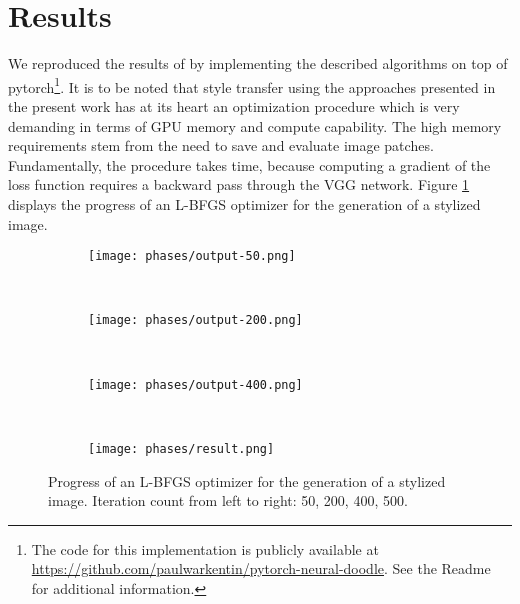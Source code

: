 
\section{Results}
\label{section:results}

We reproduced the results of \cite{doodles2016} by implementing the described algorithms on top of pytorch\footnote{The code for this implementation is publicly available at \url{https://github.com/paulwarkentin/pytorch-neural-doodle}. See the Readme for additional information.}. It is to be noted that style transfer using the approaches presented in the present work has at its heart an optimization procedure which is very demanding in terms of GPU memory and compute capability. The high memory requirements stem from the need to save and evaluate image patches. Fundamentally, the procedure takes time, because computing a gradient of the loss function requires a backward pass through the VGG network. Figure \ref{fig::phases} displays the progress of an L-BFGS optimizer for the generation of a stylized image.

\begin{figure}
	\begin{subfigure}[t]{0.23\textwidth}
		\centering
		\texttt{[image: phases/output-50.png]}
	\end{subfigure}%
	~
	\begin{subfigure}[t]{0.23\textwidth}
		\centering
		\texttt{[image: phases/output-200.png]}
	\end{subfigure}%
	~
	\begin{subfigure}[t]{0.23\textwidth}
		\centering
		\texttt{[image: phases/output-400.png]}
	\end{subfigure}
	~
	\begin{subfigure}[t]{0.23\textwidth}
		\centering
		\texttt{[image: phases/result.png]}
	\end{subfigure}
	
	\caption[]{Progress of an L-BFGS optimizer for the generation of a stylized image. Iteration count from left to right: 50, 200, 400, 500.}
	\label{fig::phases}
\end{figure}